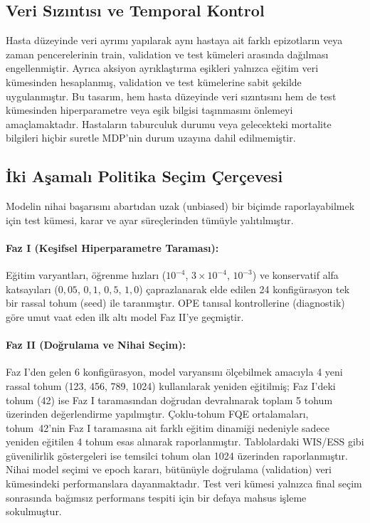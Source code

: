 \documentclass[11pt,a4paper]{article}
\begin{document}
\subsection{Veri Sızıntısı ve Temporal Kontrol}
Hasta düzeyinde veri ayrımı yapılarak aynı hastaya ait farklı epizotların veya zaman pencerelerinin train, validation ve test kümeleri arasında dağılması engellenmiştir. Ayrıca aksiyon ayrıklaştırma eşikleri yalnızca eğitim veri kümesinden hesaplanmış, validation ve test kümelerine sabit şekilde uygulanmıştır. Bu tasarım, hem hasta düzeyinde veri sızıntısını hem de test kümesinden hiperparametre veya eşik bilgisi taşınmasını önlemeyi amaçlamaktadır. Hastaların taburculuk durumu veya gelecekteki mortalite bilgileri hiçbir suretle MDP'nin durum uzayına dahil edilmemiştir.

\subsection{İki Aşamalı Politika Seçim Çerçevesi}
Modelin nihai başarısını abartıdan uzak (unbiased) bir biçimde raporlayabilmek için test kümesi, karar ve ayar süreçlerinden tümüyle yalıtılmıştır.

\paragraph{Faz I (Keşifsel Hiperparametre Taraması):} Eğitim varyantları, öğrenme hızları ($10^{-4}$, $3\times10^{-4}$, $10^{-3}$) ve konservatif alfa katsayıları ($0{,}05$, $0{,}1$, $0{,}5$, $1{,}0$) çaprazlanarak elde edilen 24 konfigürasyon tek bir rassal tohum (seed) ile taranmıştır. OPE tanısal kontrollerine (diagnostik) göre umut vaat eden ilk altı model Faz II'ye geçmiştir.

\paragraph{Faz II (Doğrulama ve Nihai Seçim):} Faz I'den gelen 6 konfigürasyon, model varyansını ölçebilmek amacıyla 4 yeni rassal tohum (123, 456, 789, 1024) kullanılarak yeniden eğitilmiş; Faz I'deki tohum (42) ise Faz I taramasından doğrudan devralınarak toplam 5 tohum üzerinden değerlendirme yapılmıştır. Çoklu-tohum FQE ortalamaları, tohum~42'nin Faz I taramasına ait farklı eğitim dinamiği nedeniyle sadece yeniden eğitilen 4 tohum esas alınarak raporlanmıştır. Tablolardaki WIS/ESS gibi güvenilirlik göstergeleri ise temsilci tohum olan 1024 üzerinden raporlanmıştır. Nihai model seçimi ve epoch kararı, bütünüyle doğrulama (validation) veri kümesindeki performanslara dayanmaktadır. Test veri kümesi yalnızca final seçim sonrasında bağımsız performans tespiti için bir defaya mahsus işleme sokulmuştur.
\end{document}
